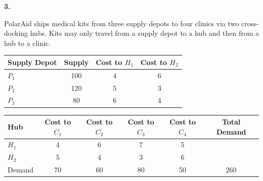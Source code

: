 \documentclass[11pt,a4paper]{article}
\begin{document}
\newpage

\textbf{3.}

PolarAid ships medical kits from three supply depots to four clinics via two cross-docking hubs.
Kits may only travel from a supply depot to a hub and then from a hub to a clinic.

\begin{center}
\begin{tabular}{lccc}
\toprule
Supply Depot & Supply & Cost to $H_1$ & Cost to $H_2$ \\
\midrule
$P_1$ & 100 & 4 & 6 \\
$P_2$ & 120 & 5 & 3 \\
$P_3$ & 80  & 6 & 4 \\
\bottomrule
\end{tabular}
\end{center}

\begin{center}
\begin{tabular}{lccccc}
\toprule
Hub & Cost to $C_1$ & Cost to $C_2$ & Cost to $C_3$ & Cost to $C_4$ & Total Demand \\
\midrule
$H_1$ & 4 & 6 & 7 & 5 & \\
$H_2$ & 5 & 4 & 3 & 6 & \\
\midrule
Demand & 70 & 60 & 80 & 50 & 260 \\
\bottomrule
\end{tabular}
\end{center}
\end{document}

